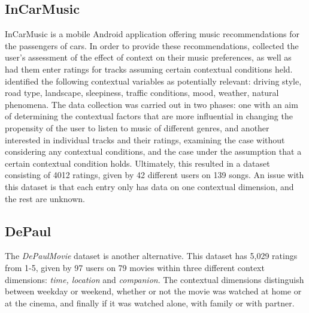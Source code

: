 \subsection{InCarMusic}
InCarMusic is a mobile Android application offering music recommendations for the passengers of cars.
In order to provide these recommendations, \cite{InCarMusic2011} collected the user's assessment of the effect of context on their music preferences, as well as had them enter ratings for tracks assuming certain contextual conditions held.
\cite{InCarMusic2011} identified the following contextual variables as potentially relevant: driving style, road type, landscape, sleepiness, traffic conditions, mood, weather, natural phenomena.
The data collection was carried out in two phases: one with an aim of determining the contextual factors that are more influential in changing the propensity of the user to listen to music of different genres, and another interested in individual tracks and their ratings, examining the case without considering any contextual conditions, and the case under the assumption that a certain contextual condition holds.
Ultimately, this resulted in a dataset consisting of 4012 ratings, given by 42 different users on 139 songs.
An issue with this dataset is that each entry only has data on one contextual dimension, and the rest are unknown.

\subsection{DePaul}
The \textit{DePaulMovie} dataset is another alternative.
This dataset has 5,029 ratings from 1-5, given by 97 users on 79 movies within three different context dimensions: \textit{time, location} and \textit{companion}\cite{DePaulData}.
The contextual dimensions distinguish between weekday or weekend, whether or not the movie was watched at home or at the cinema, and finally if it was watched alone, with family or with partner.

